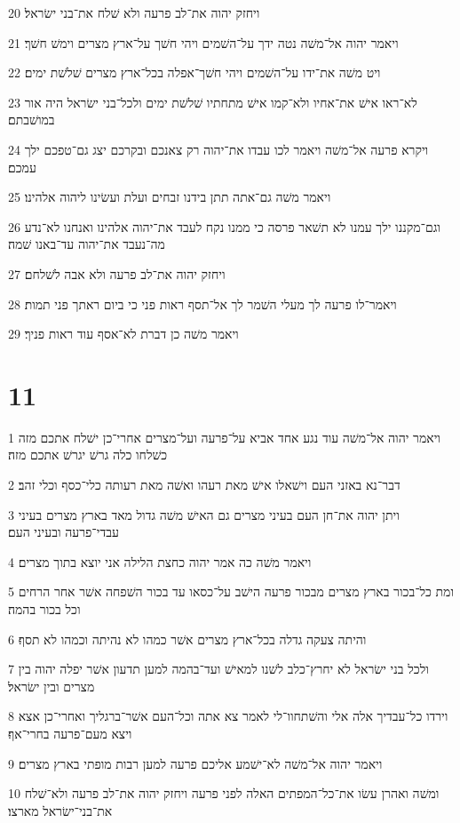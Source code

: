\par 20 ויחזק יהוה את־לב פרעה ולא שׁלח את־בני ישׂראל׃
\par 21 ויאמר יהוה אל־משׁה נטה ידך על־השׁמים ויהי חשׁך על־ארץ מצרים וימשׁ חשׁך׃
\par 22 ויט משׁה את־ידו על־השׁמים ויהי חשׁך־אפלה בכל־ארץ מצרים שׁלשׁת ימים׃
\par 23 לא־ראו אישׁ את־אחיו ולא־קמו אישׁ מתחתיו שׁלשׁת ימים ולכל־בני ישׂראל היה אור במושׁבתם׃
\par 24 ויקרא פרעה אל־משׁה ויאמר לכו עבדו את־יהוה רק צאנכם ובקרכם יצג גם־טפכם ילך עמכם׃
\par 25 ויאמר משׁה גם־אתה תתן בידנו זבחים ועלת ועשׂינו ליהוה אלהינו׃
\par 26 וגם־מקננו ילך עמנו לא תשׁאר פרסה כי ממנו נקח לעבד את־יהוה אלהינו ואנחנו לא־נדע מה־נעבד את־יהוה עד־באנו שׁמה׃
\par 27 ויחזק יהוה את־לב פרעה ולא אבה לשׁלחם׃
\par 28 ויאמר־לו פרעה לך מעלי השׁמר לך אל־תסף ראות פני כי ביום ראתך פני תמות׃
\par 29 ויאמר משׁה כן דברת לא־אסף עוד ראות פניך׃

\chapter{11}

\par 1 ויאמר יהוה אל־משׁה עוד נגע אחד אביא על־פרעה ועל־מצרים אחרי־כן ישׁלח אתכם מזה כשׁלחו כלה גרשׁ יגרשׁ אתכם מזה׃
\par 2 דבר־נא באזני העם וישׁאלו אישׁ מאת רעהו ואשׁה מאת רעותה כלי־כסף וכלי זהב׃
\par 3 ויתן יהוה את־חן העם בעיני מצרים גם האישׁ משׁה גדול מאד בארץ מצרים בעיני עבדי־פרעה ובעיני העם׃
\par 4 ויאמר משׁה כה אמר יהוה כחצת הלילה אני יוצא בתוך מצרים׃
\par 5 ומת כל־בכור בארץ מצרים מבכור פרעה הישׁב על־כסאו עד בכור השׁפחה אשׁר אחר הרחים וכל בכור בהמה׃
\par 6 והיתה צעקה גדלה בכל־ארץ מצרים אשׁר כמהו לא נהיתה וכמהו לא תסף׃
\par 7 ולכל בני ישׂראל לא יחרץ־כלב לשׁנו למאישׁ ועד־בהמה למען תדעון אשׁר יפלה יהוה בין מצרים ובין ישׂראל׃
\par 8 וירדו כל־עבדיך אלה אלי והשׁתחוו־לי לאמר צא אתה וכל־העם אשׁר־ברגליך ואחרי־כן אצא ויצא מעם־פרעה בחרי־אף׃
\par 9 ויאמר יהוה אל־משׁה לא־ישׁמע אליכם פרעה למען רבות מופתי בארץ מצרים׃
\par 10 ומשׁה ואהרן עשׂו את־כל־המפתים האלה לפני פרעה ויחזק יהוה את־לב פרעה ולא־שׁלח את־בני־ישׂראל מארצו׃

